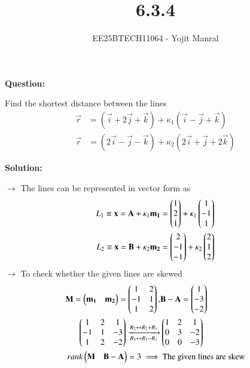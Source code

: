 \documentclass[journal]{IEEEtran}
\begin{document}

\vspace{3cm}

\title{6.3.4}
\author{EE25BTECH11064 - Yojit Manral}

\maketitle
{\let\newpage\relax\maketitle}
\renewcommand{\thefigure}{\theenumi}
\renewcommand{\thetable}{\theenumi}
\setlength{\intextsep}{10pt} %

\textbf{Question:}

Find the shortest distance between the lines
\begin{align}
    \vec{r}&=(\vec{i}+2\vec{j}+\vec{k})+\kappa_1(\vec{i}-\vec{j}+\vec{k}) \\
    \vec{r}&=(2\vec{i}-\vec{j}-\vec{k})+\kappa_2(2\vec{i}+\vec{j}+2\vec{k})
\end{align}

\textbf{Solution:}

$\longrightarrow$ The lines can be represented in vector form as
\begin{align}
    L_1 \equiv \mathbf{x} = \mathbf{A} + \kappa_1\mathbf{m_1} = \begin{pmatrix}1\\2\\1\end{pmatrix} + \kappa_1\begin{pmatrix}1\\-1\\1\end{pmatrix} \\
    L_2 \equiv \mathbf{x} = \mathbf{B} + \kappa_2\mathbf{m_2} = \begin{pmatrix}2\\-1\\-1\end{pmatrix} + \kappa_2\begin{pmatrix}2\\1\\2\end{pmatrix} 
\end{align}
$\rightarrow$ To check whether the given lines are skewed
\begin{align}
    \mathbf{M} = \begin{pmatrix}\mathbf{m_1}&\mathbf{m_2}\end{pmatrix} = \begin{pmatrix}1&2\\-1&1\\1&2\end{pmatrix}, &\mathbf{B}-\mathbf{A} = \begin{pmatrix}1\\-3\\-2\end{pmatrix} \\
    \begin{pmatrix}1&2&1\\-1&1&-3\\1&2&-2\end{pmatrix}\xrightarrow[R_3 \leftrightarrow R_3 - R_1]{R_2 \leftrightarrow R_2 + R_1}&\begin{pmatrix}1&2&1\\0&3&-2\\0&0&-3\end{pmatrix} \\
    rank\begin{pmatrix}\mathbf{M}&\mathbf{B}-\mathbf{A}\end{pmatrix} = 3 \implies& \text{ The given lines are skew}
\end{align}
\end{document}
